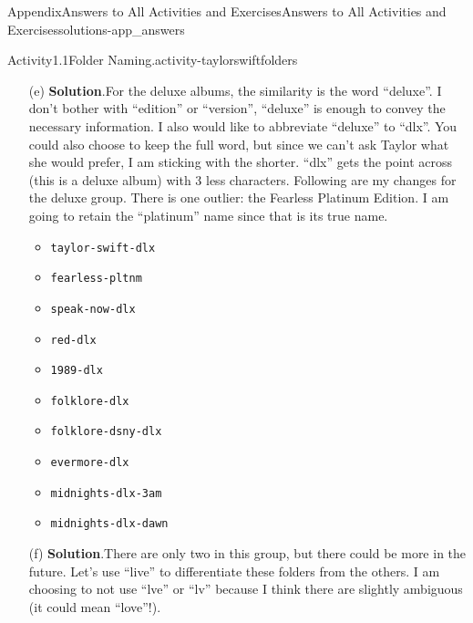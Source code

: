 \documentclass[oneside,10pt,]{book}
\newcommand{\blocktitlefont}{\relax}
\newcommand{\mono}[1]{\texttt{#1}}
\begin{document}
\begin{solutions-chapter}{Appendix}{Answers to All Activities and Exercises}{}{Answers to All Activities and Exercises}{}{}{solutions-app_answers}
\begin{activitysolution}{Activity}{1.1}{Folder Naming.}{activity-taylorswiftfolders}
\begin{enumerate}[font=\bfseries,label=(\alph*),ref=\alph*]
\begin{multicols}{2}
\begin{itemize}[label=\textbullet]
\item{}\mono{taylor-swift}%
\item{}\mono{fearless}%
\item{}\mono{speak-now}%
\item{}\mono{red}%
\item{}\mono{1989}%
\item{}\mono{reputation}%
\item{}\mono{lover}%
\item{}\mono{folklore}%
\item{}\mono{evermore}%
\item{}\mono{midnights}%
\end{itemize}
\end{multicols}
%
\item[(e)]\noindent\textbf{\blocktitlefont Solution}.\hypertarget{solution-taylorswiftfolders-h-b-back}{}\quad{}For the deluxe albums, the similarity is the word ``deluxe''. I don't bother with ``edition'' or ``version'', ``deluxe'' is enough to convey the necessary information. I also would like to abbreviate ``deluxe'' to ``dlx''. You could also choose to keep the full word, but since we can't ask Taylor what she would prefer, I am sticking with the shorter. ``dlx'' gets the point across (this is a deluxe album) with 3 less characters. Following are my changes for the deluxe group. There is one outlier: the Fearless Platinum Edition. I am going to retain the ``platinum'' name since that is its true name.%
\begin{multicols}{2}
\begin{itemize}[label=\textbullet]
\item{}\mono{taylor-swift-dlx}%
\item{}\mono{fearless-pltnm}%
\item{}\mono{speak-now-dlx}%
\item{}\mono{red-dlx}%
\item{}\mono{1989-dlx}%
\item{}\mono{folklore-dlx}%
\item{}\mono{folklore-dsny-dlx}%
\item{}\mono{evermore-dlx}%
\item{}\mono{midnights-dlx-3am}%
\item{}\mono{midnights-dlx-dawn}%
\end{itemize}
\end{multicols}
%
\item[(f)]\noindent\textbf{\blocktitlefont Solution}.\hypertarget{solution-taylorswiftfolders-i-b-back}{}\quad{}There are only two in this group, but there could be more in the future. Let's use ``live'' to differentiate these folders from the others. I am choosing to not use ``lve'' or ``lv'' because I think there are slightly ambiguous (it could mean ``love''!).%

\end{enumerate}
\end{activitysolution}
\end{solutions-chapter}
\end{document}
